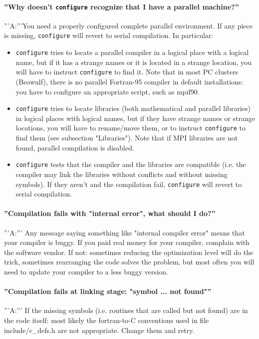 \documentclass[12pt,a4paper]{article}
\begin{document}
\paragraph{ ''Why doesn't \texttt{configure} recognize that I have a parallel machine?''}
'''A:'''You need a properly configured complete parallel
environment. If any piece  is missing, \texttt{configure} will revert to serial
compilation. In particular: 
\begin{itemize}
\item \texttt{configure} tries to locate a parallel compiler in a logical
  place with a logical name,  but if it has a strange names or it is
  located  in a strange location, you will have to instruct \texttt{configure}
  to find it. Note that in most PC clusters (Beowulf), there is no
  parallel Fortran-95 compiler in default installations:  you have to
  configure an appropriate script, such as mpif90. 
\item \texttt{configure} tries to locate libraries (both mathematical and
  parallel libraries) in logical places with logical names, but if
  they have strange names or strange locations, you will have to
  rename/move them, or to instruct \texttt{configure} to find them (see
  subsection "Libraries"). Note that if MPI libraries are not found,
  parallel compilation is disabled. 
\item \texttt{configure} tests that the compiler and the libraries are
  compatible (i.e. the compiler may link the libraries without
  conflicts and without missing symbols). If they aren't and the
  compilation fail, \texttt{configure} will revert to serial compilation. 
\end{itemize}

\paragraph{ ''Compilation fails with "internal error", what should I do?''}
'''A:''' Any message saying something like "internal compiler error" means
that your compiler is buggy. If you paid real money for your compiler,
complain with the software vendor. If not: sometimes reducing the optimization
level will do the trick, sometimes rearranging the code solves the problem,
but most often you will need to update your compiler to a less buggy version. 

\paragraph{ ''Compilation fails at linking stage: "symbol ... not found"''}
'''A:''' If the missing symbols (i.e. routines that are called but not found)
are in the code itself: most likely the fortran-to-C conventions used
in file include/c\_defs.h are not appropriate. Change them and retry.
\end{document}
